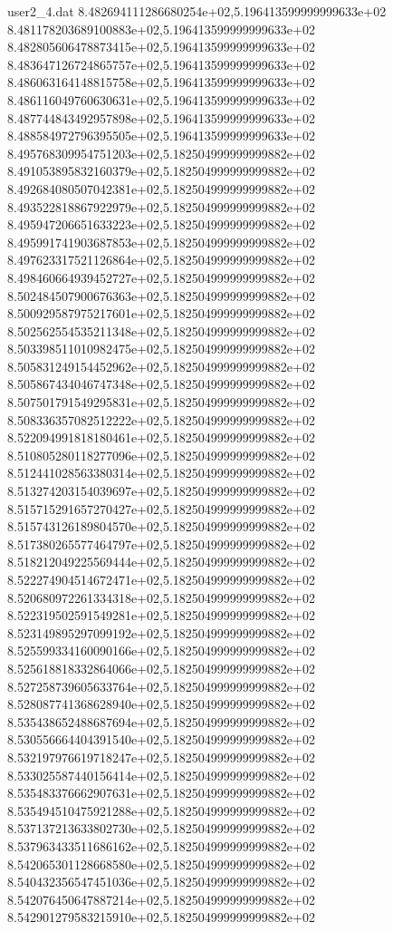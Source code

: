 \begin{filecontents}{user2_4.dat}
8.482694111286680254e+02,5.196413599999999633e+02
8.481178203689100883e+02,5.196413599999999633e+02
8.482805606478873415e+02,5.196413599999999633e+02
8.483647126724865757e+02,5.196413599999999633e+02
8.486063164148815758e+02,5.196413599999999633e+02
8.486116049760630631e+02,5.196413599999999633e+02
8.487744843492957898e+02,5.196413599999999633e+02
8.488584972796395505e+02,5.196413599999999633e+02
8.495768309954751203e+02,5.182504999999999882e+02
8.491053895832160379e+02,5.182504999999999882e+02
8.492684080507042381e+02,5.182504999999999882e+02
8.493522818867922979e+02,5.182504999999999882e+02
8.495947206651633223e+02,5.182504999999999882e+02
8.495991741903687853e+02,5.182504999999999882e+02
8.497623317521126864e+02,5.182504999999999882e+02
8.498460664939452727e+02,5.182504999999999882e+02
8.502484507900676363e+02,5.182504999999999882e+02
8.500929587975217601e+02,5.182504999999999882e+02
8.502562554535211348e+02,5.182504999999999882e+02
8.503398511010982475e+02,5.182504999999999882e+02
8.505831249154452962e+02,5.182504999999999882e+02
8.505867434046747348e+02,5.182504999999999882e+02
8.507501791549295831e+02,5.182504999999999882e+02
8.508336357082512222e+02,5.182504999999999882e+02
8.522094991818180461e+02,5.182504999999999882e+02
8.510805280118277096e+02,5.182504999999999882e+02
8.512441028563380314e+02,5.182504999999999882e+02
8.513274203154039697e+02,5.182504999999999882e+02
8.515715291657270427e+02,5.182504999999999882e+02
8.515743126189804570e+02,5.182504999999999882e+02
8.517380265577464797e+02,5.182504999999999882e+02
8.518212049225569444e+02,5.182504999999999882e+02
8.522274904514672471e+02,5.182504999999999882e+02
8.520680972261334318e+02,5.182504999999999882e+02
8.522319502591549281e+02,5.182504999999999882e+02
8.523149895297099192e+02,5.182504999999999882e+02
8.525599334160090166e+02,5.182504999999999882e+02
8.525618818332864066e+02,5.182504999999999882e+02
8.527258739605633764e+02,5.182504999999999882e+02
8.528087741368628940e+02,5.182504999999999882e+02
8.535438652488687694e+02,5.182504999999999882e+02
8.530556664404391540e+02,5.182504999999999882e+02
8.532197976619718247e+02,5.182504999999999882e+02
8.533025587440156414e+02,5.182504999999999882e+02
8.535483376662907631e+02,5.182504999999999882e+02
8.535494510475921288e+02,5.182504999999999882e+02
8.537137213633802730e+02,5.182504999999999882e+02
8.537963433511686162e+02,5.182504999999999882e+02
8.542065301128668580e+02,5.182504999999999882e+02
8.540432356547451036e+02,5.182504999999999882e+02
8.542076450647887214e+02,5.182504999999999882e+02
8.542901279583215910e+02,5.182504999999999882e+02

\end{filecontents}
